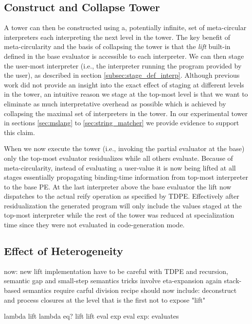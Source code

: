 \documentclass[a4paper,12pt,twoside,openright]{report}
\theoremstyle{definition}
\begin{document}
\subsection{Construct and Collapse Tower}
A tower can then be constructed using a, potentially infinite, set of meta-circular interpreters each interpreting the next level in the tower. The key benefit of meta-circularity and the basis of collapsing the tower is that the \textit{lift} built-in defined in the base evaluator is accessible to each interpreter. We can then stage the user-most interpreter (i.e., the interpreter running the program provided by the user), as described in section \ref{subsec:stage_def_interp}. Although previous work did not provide an insight into the exact effect of staging at different levels in the tower, an intuitive reason we stage at the top-most level is that we want to eliminate as much interpretative overhead as possible which is achieved by collapsing the maximal set of interpreters in the tower. In our experimental tower in sections \ref{sec:mslang} to \ref{sec:string_matcher} we provide evidence to support this claim.

When we now execute the tower (i.e., invoking the partial evaluator at the base) only the top-most evaluator residualizes while all others evaluate. Because of meta-circularity, instead of evaluating a user-value it is now being lifted at all stages essentially propagating binding-time information from top-most interpreter to the base PE. At the last interpreter above the base evaluator the lift now dispatches to the actual reify operation as specified by TDPE. Effectively after residualization the generated program will only include the values staged at the top-most interpreter while the rest of the tower was reduced at specialization time since they were not evaluated in code-generation mode.

\subsection{Effect of Heterogeneity}
    now:
        new lift implementation
        have to be careful with TDPE and recursion, semantic gap and small-step semantics
        tricks involve eta-expansion again
        stack-based semantics require carful division
        recipe should now include: deconstruct and process closures at the level that is the first not to expose "lift"

lambda
lift lambda
eq? lift
    lift eval exp
        eval exp: evaluates
\end{document}

